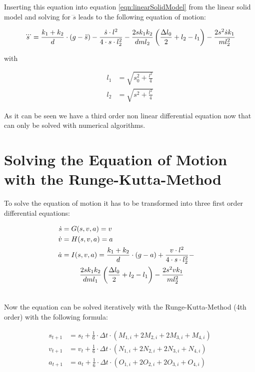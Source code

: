 Inserting this equation into equation \ref{eqn:linearSolidModel} from the linear solid model and solving for $\dddot s$ leads to the following equation of motion:

\begin{equation}
\begin{split}
	\dddot s = \frac{k_1 + k_2}{d} \cdot (g - \ddot s) - 
	\frac{\dot s\cdot l^2}{4\cdot s \cdot l_2^2}-
	\frac{2sk_1k_2}{dml_2} \left(\frac{\Delta l_0}{2} + l_2 - l_1\right) - \frac{2s^2\dot s k_1}{ml_2^2}	
\end{split}
\label{eqn:equationOfEmotion}
\end{equation}

with

\begin{align}
	l_1 &= \sqrt{s_0^2 + \frac{l^2}{4}} \\
	l_2 &= \sqrt{s^2 + \frac{l^2}{4}}
\end{align}

As it can be seen we have a third order non linear differential equation now that can only be solved with numerical algorithms.

\section{Solving the Equation of Motion with the Runge-Kutta-Method }

To solve the equation of motion it has to be transformed into three first order differential equations:

\begin{align}
	\dot s &=G(s,v,a) = v \\
	\dot v &= H(s,v,a) = a \\
	\dot a &\begin{multlined}[t] = I(s,v,a) =\insertForSmartphone{\\} \frac{k_1 + k_2}{d} \cdot (g - a) + \frac{v\cdot l^2}{4\cdot s \cdot l_2^2} - \\ \frac{2sk_1k_2}{dml_1} \left(\frac{\Delta l_0}{2} + l_2 - l_1\right) - \frac{2s^2v k_1}{ml_2^2} \\
	\end{multlined}
\end{align}

Now the equation can be solved iteratively with the Runge-Kutta-Method (4th order) with the following formula:

\begin{align}
	s_{t+1} &= s_t + \frac{1}{6} \cdot \Delta t \cdot (M_{1,i} + 2 M_{2,i} +2M_{3,i} +M_{4,i} ) \\ v_{t+1} &= v_t + \frac{1}{6} \cdot \Delta t \cdot (N_{1,i} + 2 N_{2,i} +2N_{3,i} +N_{4,i} ) \\
	a_{t+1} &= a_t + \frac{1}{6} \cdot \Delta t \cdot (O_{1,i} + 2 O_{2,i} +2O_{3,i} +O_{4,i} ) 
\end{align}

